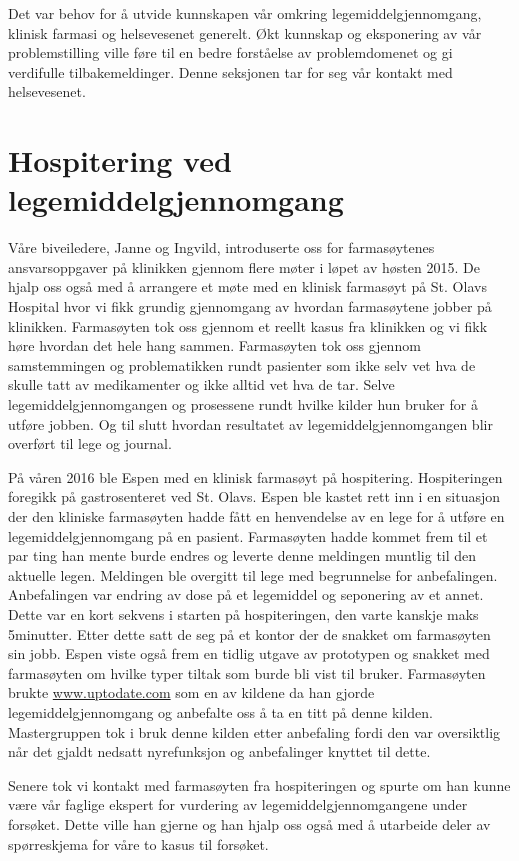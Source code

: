 
Det var behov for å utvide kunnskapen vår omkring legemiddelgjennomgang, klinisk farmasi og helsevesenet generelt. Økt kunnskap og eksponering av vår problemstilling ville føre til en bedre forståelse av problemdomenet og gi verdifulle tilbakemeldinger. Denne seksjonen tar for seg vår kontakt med helsevesenet. 

\section{Hospitering ved legemiddelgjennomgang}\label{hospitering}
Våre biveiledere, Janne og Ingvild, introduserte oss for farmasøytenes ansvarsoppgaver på klinikken gjennom flere møter i løpet av høsten 2015. De hjalp oss også med å arrangere et møte med en klinisk farmasøyt på St. Olavs Hospital hvor vi fikk grundig gjennomgang av hvordan farmasøytene jobber på klinikken. Farmasøyten tok oss gjennom et reellt kasus fra klinikken og vi fikk høre hvordan det hele hang sammen. Farmasøyten tok oss gjennom samstemmingen og problematikken rundt pasienter som ikke selv vet hva de skulle tatt av medikamenter og ikke alltid vet hva de tar. Selve legemiddelgjennomgangen og prosessene rundt hvilke kilder hun bruker for å utføre jobben. Og til slutt hvordan resultatet av legemiddelgjennomgangen blir overført til lege og journal.

På våren 2016 ble Espen med en klinisk farmasøyt på hospitering. Hospiteringen foregikk på gastrosenteret ved St. Olavs. Espen ble kastet rett inn i en situasjon der den kliniske farmasøyten hadde fått en henvendelse av en lege for å utføre en legemiddelgjennomgang på en pasient. Farmasøyten hadde kommet frem til et par ting han mente burde endres og leverte denne meldingen muntlig til den aktuelle legen. Meldingen ble overgitt til lege med begrunnelse for anbefalingen. Anbefalingen var endring av dose på et legemiddel og seponering av et annet. Dette var en kort sekvens i starten på hospiteringen, den varte kanskje maks 5minutter. Etter dette satt de seg på et kontor der de snakket om farmasøyten sin jobb. Espen viste også frem en tidlig utgave av prototypen og snakket med farmasøyten om hvilke typer tiltak som burde bli vist til bruker. Farmasøyten brukte \url{www.uptodate.com} som en av kildene da han gjorde legemiddelgjennomgang og anbefalte oss å ta en titt på denne kilden. Mastergruppen tok i bruk denne kilden etter anbefaling fordi den var oversiktlig når det gjaldt nedsatt nyrefunksjon og anbefalinger knyttet til dette.

Senere tok vi kontakt med farmasøyten fra hospiteringen og spurte om han kunne være vår faglige ekspert for vurdering av legemiddelgjennomgangene under forsøket. Dette ville han gjerne og han hjalp oss også med å utarbeide deler av spørreskjema for våre to kasus til forsøket. 

